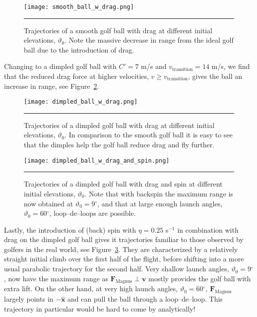 \documentclass[notitlepage,aps,prd,nofootinbib]{revtex4-1}
\newcommand{\degree}{\ensuremath{^{\circ}}}
\begin{document}
\vspace{-0.4cm}

\begin{figure}[!htbc]
  \centering
  \texttt{[image: smooth\_ball\_w\_drag.png]}
	{\par\nobreak\rule[9pt]{35em}{0.5pt}\vspace{-5mm}}
	\caption{Trajectories of a smooth golf ball with drag at different initial elevations, $\vartheta_{0}$. Note the massive decrease in range from the ideal golf ball due to the introduction of drag.}
	\label{fig:smooth_ball_w_drag}
\end{figure}

\clearpage

Changing to a dimpled golf ball with $C' = 7$ m/s and $v_{\text{transition}} = 14$ m/s, we find that the reduced drag force at higher velocities, $v \geq v_{\text{transition}}$, gives the ball an increase in range, see Figure~\ref{fig:dimpled_ball_w_drag}.

\begin{figure}[!htbc]
  \centering
  \texttt{[image: dimpled\_ball\_w\_drag.png]}
	{\par\nobreak\rule[9pt]{35em}{0.5pt}\vspace{-5mm}}
	\caption{Trajectories of a dimpled golf ball with drag at different initial elevations, $\vartheta_{0}$. In comparison to the smooth golf ball it is easy to see that the dimples help the golf ball reduce drag and fly further.}
	\label{fig:dimpled_ball_w_drag}
\end{figure}

\begin{figure}[!htbc]
  \centering
  \texttt{[image: dimpled\_ball\_w\_drag\_and\_spin.png]}
	{\par\nobreak\rule[9pt]{35em}{0.5pt}\vspace{-5mm}}
	\caption{Trajectories of a dimpled golf ball with drag and spin at different initial elevations, $\vartheta_{0}$. Note that with backspin the maximum range is now obtained at $\vartheta_{0} = 9\degree$, and that at large enough launch angles, $\vartheta_{0} = 60\degree$, loop--de--loops are possible.}
	\label{fig:dimpled_ball_w_drag_and_spin}
\end{figure}


\clearpage

Lastly, the introduction of (back) spin with $\eta = 0.25$ s$^{-1}$ in combination with drag on the dimpled golf ball gives it trajectories familiar to those observed by golfers in the real world, see Figure~\ref{fig:dimpled_ball_w_drag_and_spin}. They are characterized by a relatively straight initial climb over the first half of the flight, before shifting into a more usual parabolic trajectory for the second half. Very shallow launch angles, $\vartheta_{0} = 9\degree$, now have the maximum range as $\mathbf{F}_{\text{Magnus}} \perp \mathbf{v}$ mostly provides the golf ball with extra lift. On the other hand, at very high launch angles, $\vartheta_{0} = 60\degree$, $\mathbf{F}_{\text{Magnus}}$ largely points in $-\hat{\textbf{x}}$ and can pull the ball through a loop--de--loop. This trajectory in particular would be hard to come by analytically!
\end{document}
